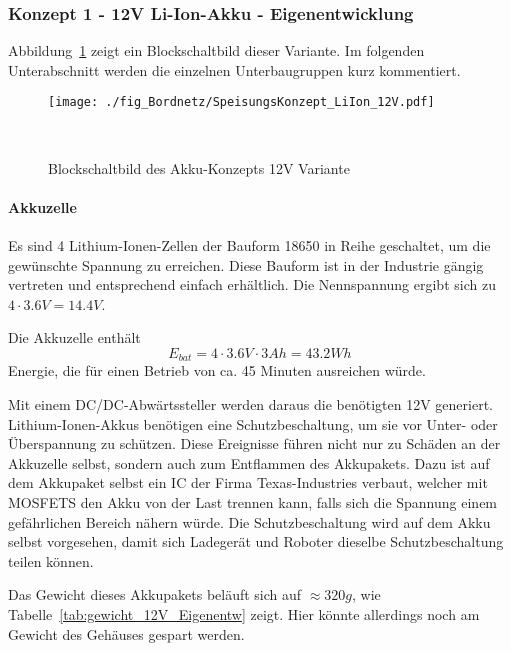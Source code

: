 \documentclass[main.tex]{subfiles} %
\begin{document}
\subsubsection*{Konzept 1 - 12V Li-Ion-Akku - Eigenentwicklung}

Abbildung~\ref{fig:Konzept_12V_Eigenentw} zeigt ein Blockschaltbild dieser
Variante. Im folgenden Unterabschnitt werden die einzelnen Unterbaugruppen kurz
kommentiert.

\begin{figure}[h!]
    \centering
    \texttt{[image: ./fig\_Bordnetz/SpeisungsKonzept\_LiIon\_12V.pdf]}
    \caption{Blockschaltbild des Akku-Konzepts 12V Variante}~\label{fig:Konzept_12V_Eigenentw}
\end{figure}

\paragraph{Akkuzelle}
Es sind 4 Lithium-Ionen-Zellen der Bauform 18650 in Reihe geschaltet, um die
gewünschte Spannung zu erreichen. Diese Bauform ist in der Industrie gängig
vertreten und entsprechend einfach erhältlich. Die Nennspannung ergibt sich zu
$4 \cdot 3.6V = 14.4V$.

Die Akkuzelle enthält
\[
    E_{bat} = 4 \cdot 3.6V \cdot 3Ah = 43.2Wh
\]
Energie, die für einen Betrieb von ca. 45 Minuten ausreichen würde.

Mit einem DC/DC-Abwärtssteller werden daraus die benötigten 12V generiert.
Lithium-Ionen-Akkus benötigen eine Schutzbeschaltung, um sie vor Unter- oder
Überspannung zu schützen. Diese Ereignisse führen nicht nur zu Schäden an der
Akkuzelle selbst, sondern auch zum Entflammen des Akkupakets. Dazu ist auf dem
Akkupaket selbst ein IC der Firma Texas-Industries verbaut, welcher mit MOSFETS
den Akku von der Last trennen kann, falls sich die Spannung einem gefährlichen
Bereich nähern würde. Die Schutzbeschaltung wird auf dem Akku selbst
vorgesehen, damit sich Ladegerät und Roboter dieselbe Schutzbeschaltung teilen
können.

Das Gewicht dieses Akkupakets beläuft sich auf $\approx 320 g$, wie
Tabelle~\ref{tab:gewicht_12V_Eigenentw} zeigt. Hier könnte allerdings noch am
Gewicht des Gehäuses gespart werden.
\end{document}

